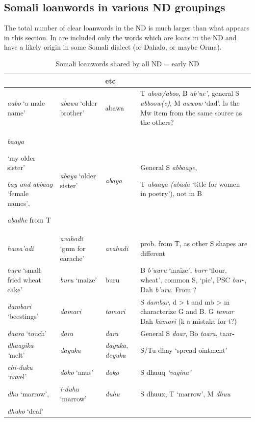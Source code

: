 \documentclass[output=paper,newtxmath,modfonts,nonflat,hidelinks]{langsci/langscibook}
\begin{document}
\subsection{Somali loanwords in various ND groupings}\label{sec:nurse:5.4} The total number of clear loanwords in the ND is much larger than what appears in this section. In  are included only the words which are loans in the ND and have a likely origin in some Somali dialect (or Dahalo, or maybe Orma).
 
\begin{table}
\footnotesize
\caption{Somali loanwords shared by all ND = early ND}
\label{tab:nurse:2}
\begin{tabularx}{\textwidth}{>{\raggedright}p{2.75cm}>{\raggedright}p{1.5cm}p{1.2cm}Q}
\lsptoprule
{} &  &  etc & \footnotemark{}\\
\midrule
\textit{aabo} ‘a male name’ & \textit{abawa} ‘older brother’ & abawa & T \textit{abow/aboo}, B \textit{ab’ue’}, general S \textit{abboow(e)}, M \textit{aawow} ‘dad’. Is the Mw item from the same source as the others?\\
\textit{baaya}

‘my older sister’

\textit{bay and abbaay} ‘female names’,

\textit{abadhe} from T & \textit{abaya} ‘older sister’ & \textit{abaya} & General S \textit{abbaaye},

T \textit{abaaya  (abada} ‘title for women in poetry’), not in B\\
\textit{hawa’adi}  & \textit{avahadi} ‘gum for earache’ & \textit{avahadi} & prob. from T, as other S shapes are different\\
\textit{buru} ‘small fried wheat cake’ & \textit{buru} ‘maize’ & buru & B \textit{b’uuru} ‘maize’,  \textit{burr} ‘flour, wheat’, common S,  ‘pie’, PSC \textit{bur}{}-, Dah \textit{b’uru.} From ?\\
\textit{dambari} ‘beestings’ & \textit{damari}\footnotemark{} & \textit{tamari} & S \textit{dambar,} d > t and mb > m characterize G and B. G \textit{tamar} Dah \textit{kamari} (k a mistake for t?)\footnotemark{}\\
\textit{daara} ‘touch’ & \textit{dara} & \textit{dara} & General S \textit{daar}, Bo \textit{taara},  taar\textbf{{}-} \\
\textit{dhaayika ‘}melt’ & \textit{dayuka} & \textit{dayuka, deyuka} & S/Tu dhay ‘spread ointment’\\
\textit{chi-d}\textit{uku} ‘navel’ & \textit{doko} ‘anus’ & \textit{doko} & S dhuuq \textit{‘vagina’}\\
\textit{dhu} ‘marrow’, & \textit{i-d}\textit{uhu} ‘marrow’ & \textit{duhu} & S dhuux, T ‘marrow’, M \textit{dhuu}\\
\textit{dhuko} ‘deaf’


\end{tabularx}
\end{table}
\end{document}
